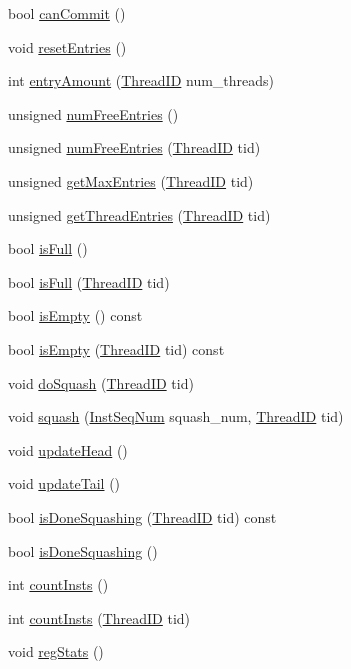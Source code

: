 \begin{DoxyCompactItemize}
bool \hyperlink{classROB_a47c266650f91e4f5670ea25d8e7b787b}{canCommit} ()
\item 
void \hyperlink{classROB_aaf9a05771a835f9f8d634cef36e24d40}{resetEntries} ()
\item 
int \hyperlink{classROB_a5d2b0e4e7d98ea4ebd9fb98ac0d91e2f}{entryAmount} (\hyperlink{base_2types_8hh_ab39b1a4f9dad884694c7a74ed69e6a6b}{ThreadID} num\_\-threads)
\item 
unsigned \hyperlink{classROB_a028971a565aca048c67ea1c36a6a9d51}{numFreeEntries} ()
\item 
unsigned \hyperlink{classROB_acc878f608deead5b5319a6a3f98b50c8}{numFreeEntries} (\hyperlink{base_2types_8hh_ab39b1a4f9dad884694c7a74ed69e6a6b}{ThreadID} tid)
\item 
unsigned \hyperlink{classROB_a9844bb4676b40d12c10f411ffdd4b148}{getMaxEntries} (\hyperlink{base_2types_8hh_ab39b1a4f9dad884694c7a74ed69e6a6b}{ThreadID} tid)
\item 
unsigned \hyperlink{classROB_a6461a6d64f301a64dbf720f1290114eb}{getThreadEntries} (\hyperlink{base_2types_8hh_ab39b1a4f9dad884694c7a74ed69e6a6b}{ThreadID} tid)
\item 
bool \hyperlink{classROB_a3e70330939fdfc4dbc2f60c1a660584d}{isFull} ()
\item 
bool \hyperlink{classROB_a30fac732df9b3fda011c7329a112cb31}{isFull} (\hyperlink{base_2types_8hh_ab39b1a4f9dad884694c7a74ed69e6a6b}{ThreadID} tid)
\item 
bool \hyperlink{classROB_a479432127ee77145cc19d6a2d1590821}{isEmpty} () const 
\item 
bool \hyperlink{classROB_a1a6e3ff5a958bb55857fcf09f6d26ce7}{isEmpty} (\hyperlink{base_2types_8hh_ab39b1a4f9dad884694c7a74ed69e6a6b}{ThreadID} tid) const 
\item 
void \hyperlink{classROB_a06cf52c4f09162bea03ec848f247151a}{doSquash} (\hyperlink{base_2types_8hh_ab39b1a4f9dad884694c7a74ed69e6a6b}{ThreadID} tid)
\item 
void \hyperlink{classROB_aee9dc23de90acd20200641407a3bd1da}{squash} (\hyperlink{inst__seq_8hh_a258d93d98edaedee089435c19ea2ea2e}{InstSeqNum} squash\_\-num, \hyperlink{base_2types_8hh_ab39b1a4f9dad884694c7a74ed69e6a6b}{ThreadID} tid)
\item 
void \hyperlink{classROB_a5284fa5ccee18ce965fb4863722e96a9}{updateHead} ()
\item 
void \hyperlink{classROB_acc69b1041902d0557b7be476f5c547aa}{updateTail} ()
\item 
bool \hyperlink{classROB_acd4497e40e00ada9d4d15336dcb35be8}{isDoneSquashing} (\hyperlink{base_2types_8hh_ab39b1a4f9dad884694c7a74ed69e6a6b}{ThreadID} tid) const 
\item 
bool \hyperlink{classROB_a361dee23017319068ba1585a4c393868}{isDoneSquashing} ()
\item 
int \hyperlink{classROB_ab654970f03abd90f0c397bba8e218bc9}{countInsts} ()
\item 
int \hyperlink{classROB_ac7828ae51d0a8c259745a7f45410a368}{countInsts} (\hyperlink{base_2types_8hh_ab39b1a4f9dad884694c7a74ed69e6a6b}{ThreadID} tid)
\item 
void \hyperlink{classROB_a4dc637449366fcdfc4e764cdf12d9b11}{regStats} ()
\end{DoxyCompactItemize}
